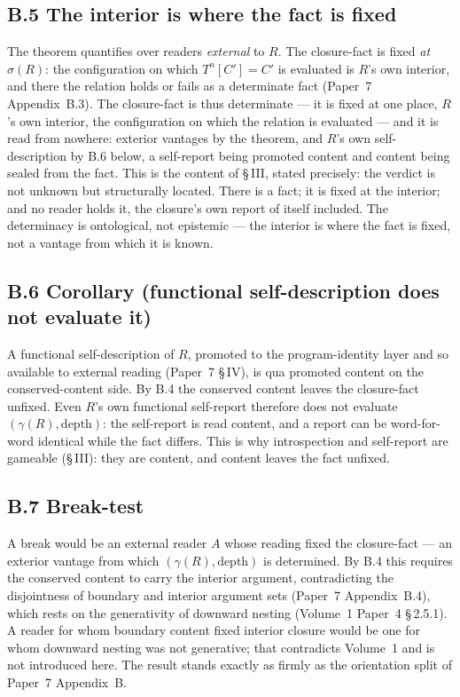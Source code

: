 \documentclass[11pt,oneside]{report}
\theoremstyle{definition}
\theoremstyle{remark}
\begin{document}
\subsection*{B.5 The interior is where the fact is fixed}

The theorem quantifies over readers \emph{external} to \ensuremath{R}. The closure-fact is fixed \emph{at} \ensuremath{\sigma(R)}: the configuration on which \ensuremath{T^{n}[C'] = C'} is evaluated is \ensuremath{R}'s own interior, and there the relation holds or fails as a determinate fact (Paper~7 Appendix~B.3). The closure-fact is thus determinate --- it is fixed at one place, \ensuremath{R}'s own interior, the configuration on which the relation is evaluated --- and it is read from nowhere: exterior vantages by the theorem, and \ensuremath{R}'s own self-description by B.6 below, a self-report being promoted content and content being sealed from the fact. This is the content of \S\,III, stated precisely: the verdict is not unknown but structurally located. There is a fact; it is fixed at the interior; and no reader holds it, the closure's own report of itself included. The determinacy is ontological, not epistemic --- the interior is where the fact is fixed, not a vantage from which it is known.

\subsection*{B.6 Corollary (functional self-description does not evaluate it)}

A functional self-description of \ensuremath{R}, promoted to the program-identity layer and so available to external reading (Paper~7 \S\,IV), is qua promoted content on the conserved-content side. By B.4 the conserved content leaves the closure-fact unfixed. Even \ensuremath{R}'s own functional self-report therefore does not evaluate \ensuremath{(\gamma(R), \text{depth})}: the self-report is read content, and a report can be word-for-word identical while the fact differs. This is why introspection and self-report are gameable (\S\,III): they are content, and content leaves the fact unfixed.

\subsection*{B.7 Break-test}

A break would be an external reader \ensuremath{A} whose reading fixed the closure-fact --- an exterior vantage from which \ensuremath{(\gamma(R),\text{depth})} is determined. By B.4 this requires the conserved content to carry the interior argument, contradicting the disjointness of boundary and interior argument sets (Paper~7 Appendix~B.4), which rests on the generativity of downward nesting (Volume~1 Paper~4 \S\,2.5.1). A reader for whom boundary content fixed interior closure would be one for whom downward nesting was not generative; that contradicts Volume~1 and is not introduced here. The result stands exactly as firmly as the orientation split of Paper~7 Appendix~B.
\end{document}

